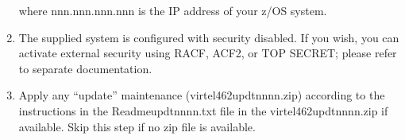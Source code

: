 \documentclass[letterpaper,10pt,english]{sphinxmanual}
\begin{document}
\begin{enumerate}
\sphinxAtStartPar
{}

\sphinxAtStartPar
where nnn.nnn.nnn.nnn is the IP address of your z/OS system.

\item {} 
\sphinxAtStartPar
The supplied system is configured with security disabled. If you wish, you can activate external security using RACF, ACF2, or TOP SECRET; please refer to separate documentation.

\item {} 
\sphinxAtStartPar
Apply any “update” maintenance (virtel462updtnnnn.zip) according to the instructions in the Readme\sphinxhyphen{}updtnnnn.txt file in the virtel462updtnnnn.zip if available. Skip this step if no zip file is available.

\end{enumerate}
\end{document}
